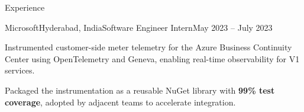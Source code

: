 \begin{rSection}{Experience}
    \begin{rSubsection}{Microsoft}{Hyderabad, India}{Software Engineer Intern}{May 2023 -- July 2023}
        \item Instrumented customer-side meter telemetry for the Azure Business Continuity Center using OpenTelemetry and Geneva, enabling real-time observability for V1 services.
        \item Packaged the instrumentation as a reusable NuGet library with \textbf{99\% test coverage}, adopted by adjacent teams to accelerate integration.
    \end{rSubsection}

\end{rSection}
